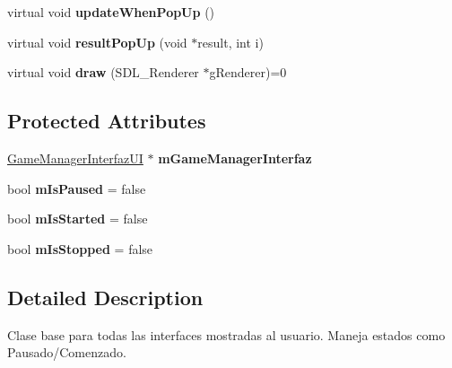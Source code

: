 \begin{DoxyCompactItemize}
\item 
virtual void {\bfseries update\+When\+Pop\+Up} ()\hypertarget{class_interfaz_u_i_ac1bb29ecec25c6087fbbcf31f8b800b7}{}\label{class_interfaz_u_i_ac1bb29ecec25c6087fbbcf31f8b800b7}

\item 
virtual void {\bfseries result\+Pop\+Up} (void $\ast$result, int i)\hypertarget{class_interfaz_u_i_a3ced38e69975a52d3754e9d162f36a2a}{}\label{class_interfaz_u_i_a3ced38e69975a52d3754e9d162f36a2a}

\item 
virtual void {\bfseries draw} (S\+D\+L\+\_\+\+Renderer $\ast$g\+Renderer)=0\hypertarget{class_interfaz_u_i_ae5be2033f8219024253243d38f570a64}{}\label{class_interfaz_u_i_ae5be2033f8219024253243d38f570a64}

\end{DoxyCompactItemize}
\subsection*{Protected Attributes}
\begin{DoxyCompactItemize}
\item 
\hyperlink{class_game_manager_interfaz_u_i}{Game\+Manager\+Interfaz\+UI} $\ast$ {\bfseries m\+Game\+Manager\+Interfaz}\hypertarget{class_interfaz_u_i_adf577e23c777efaf6e9323f8f3ac847a}{}\label{class_interfaz_u_i_adf577e23c777efaf6e9323f8f3ac847a}

\item 
bool {\bfseries m\+Is\+Paused} = false\hypertarget{class_interfaz_u_i_a060ab00c29297fc4e34395d731c5415e}{}\label{class_interfaz_u_i_a060ab00c29297fc4e34395d731c5415e}

\item 
bool {\bfseries m\+Is\+Started} = false\hypertarget{class_interfaz_u_i_aa5920e1cb002b0a09380841149ec6b84}{}\label{class_interfaz_u_i_aa5920e1cb002b0a09380841149ec6b84}

\item 
bool {\bfseries m\+Is\+Stopped} = false\hypertarget{class_interfaz_u_i_a067e003fadf4e356b9533d15138566f7}{}\label{class_interfaz_u_i_a067e003fadf4e356b9533d15138566f7}

\end{DoxyCompactItemize}


\subsection{Detailed Description}
Clase base para todas las interfaces mostradas al usuario. Maneja estados como Pausado/\+Comenzado.

